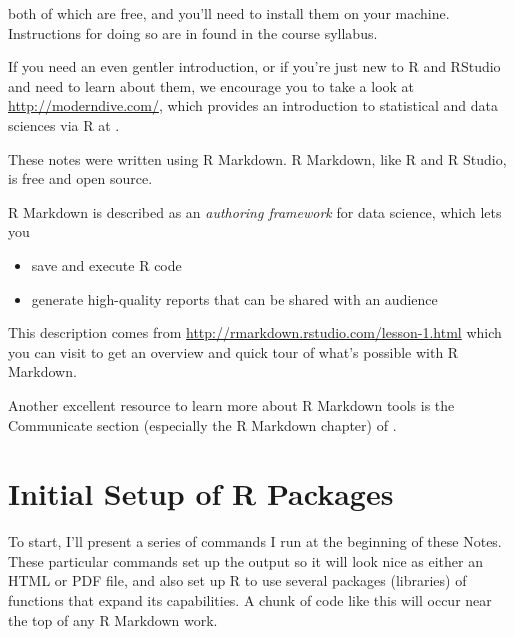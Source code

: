 \documentclass[
]{book}
\providecommand{\tightlist}{%
  \setlength{\itemsep}{0pt}\setlength{\parskip}{0pt}}
\begin{document}
both of which are free, and you'll need to install them on your machine. Instructions for doing so are in found in the course syllabus.

If you need an even gentler introduction, or if you're just new to R and RStudio and need to learn about them, we encourage you to take a look at \url{http://moderndive.com/}, which provides an introduction to statistical and data sciences via R at \citet{ModernDive}.

These notes were written using R Markdown. R Markdown, like R and R Studio, is free and open source.

R Markdown is described as an \emph{authoring framework} for data science, which lets you

\begin{itemize}
\tightlist
\item
  save and execute R code
\item
  generate high-quality reports that can be shared with an audience
\end{itemize}

This description comes from \url{http://rmarkdown.rstudio.com/lesson-1.html} which you can visit to get an overview and quick tour of what's possible with R Markdown.

Another excellent resource to learn more about R Markdown tools is the Communicate section (especially the R Markdown chapter) of \citet{R4DS}.

\hypertarget{initial-setup-of-r-packages}{%
\section*{Initial Setup of R Packages}\label{initial-setup-of-r-packages}}

To start, I'll present a series of commands I run at the beginning of these Notes. These particular commands set up the output so it will look nice as either an HTML or PDF file, and also set up R to use several packages (libraries) of functions that expand its capabilities. A chunk of code like this will occur near the top of any R Markdown work.
\end{document}
